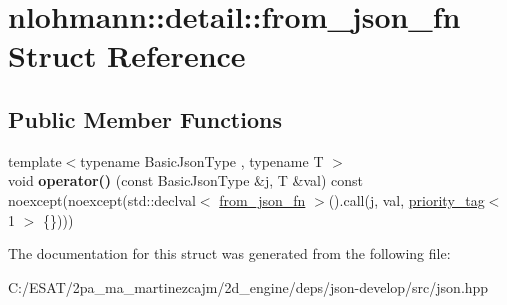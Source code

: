 \hypertarget{structnlohmann_1_1detail_1_1from__json__fn}{}\section{nlohmann\+:\+:detail\+:\+:from\+\_\+json\+\_\+fn Struct Reference}
\label{structnlohmann_1_1detail_1_1from__json__fn}
\subsection*{Public Member Functions}
\begin{DoxyCompactItemize}
\item 
\mbox{\label{structnlohmann_1_1detail_1_1from__json__fn_a48e82ad9d244fdf249caa970a253e214}} 
{\footnotesize template$<$typename Basic\+Json\+Type , typename T $>$ }\\void {\bfseries operator()} (const Basic\+Json\+Type \&j, T \&val) const noexcept(noexcept(std\+::declval$<$ \hyperlink{structnlohmann_1_1detail_1_1from__json__fn}{from\+\_\+json\+\_\+fn} $>$().call(j, val, \hyperlink{structnlohmann_1_1detail_1_1priority__tag}{priority\+\_\+tag}$<$ 1 $>$ \{\})))
\end{DoxyCompactItemize}


The documentation for this struct was generated from the following file\+:\begin{DoxyCompactItemize}
\item 
C\+:/\+E\+S\+A\+T/2pa\+\_\+ma\+\_\+martinezcajm/2d\+\_\+engine/deps/json-\/develop/src/json.\+hpp\end{DoxyCompactItemize}
